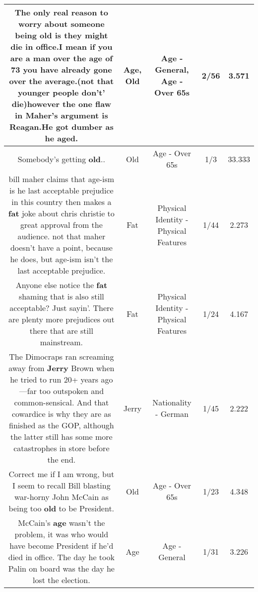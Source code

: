 \documentclass[11pt]{article}
\newlength\mylength
\begin{document}
\begin{center}
\begin{longtable}{|C{.65\mylength}|C{.30\mylength}|C{.12\mylength}|C{.12\mylength}|C{.12\mylength}|}
  \small The only real reason to worry about someone being \textbf{old} is they might die in office.I mean if you are a man over the \textbf{age} of 73 you have already gone over the average.(not that younger people don't' die)however the one flaw in Maher's argument is Reagan.He got dumber as he aged.\normalsize   & Age, Old & Age - General, Age - Over 65s & 2/56 & 3.571 \\  \hline
  \small Somebody's getting \textbf{old}..\normalsize   & Old & Age - Over 65s & 1/3 & 33.333 \\  \hline
  \small bill maher claims that age-ism is he last acceptable prejudice in this country then makes a \textbf{fat} joke about chris christie to great approval from the audience. not that maher doesn't have a point, because he does, but age-ism isn't the last acceptable prejudice.\normalsize   & Fat & Physical Identity - Physical Features & 1/44 & 2.273 \\  \hline
  \small Anyone else notice the \textbf{fat} shaming that is also still acceptable? Just sayin'. There are plenty more prejudices out there that are still mainstream.\normalsize   & Fat & Physical Identity - Physical Features & 1/24 & 4.167 \\  \hline
  \small The Dimocraps ran screaming away from \textbf{Jerry} Brown when he tried to run 20+ years ago---far too outspoken and common-sensical. And that cowardice is why they are as finished as the GOP, although the latter still has some more catastrophes in store before the end.\normalsize   & Jerry & Nationality - German & 1/45 & 2.222 \\  \hline
  \small Correct me if I am wrong, but I seem to recall Bill blasting war-horny John McCain as being too \textbf{old} to be President.\normalsize   & Old & Age - Over 65s & 1/23 & 4.348 \\  \hline
  \small McCain's \textbf{age} wasn't the problem, it was who would have become President if he'd died in office. The day he took Palin on board was the day he lost the election.\normalsize   & Age & Age - General & 1/31 & 3.226 \\  \hline

\end{longtable}
\end{center}
\end{document}
